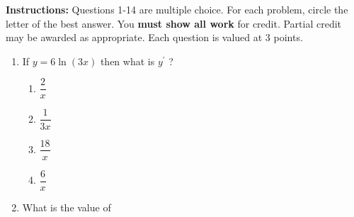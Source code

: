 \documentclass{article}
\begin{document}
\pagestyle{fancy}
\fancyhf{}
\renewcommand{\footrulewidth}{0.4pt}

\noindent
\textbf{Instructions:} Questions 1-14 are multiple choice. For each problem, circle the letter of the best answer.
You \textbf{must show all work} for credit. Partial credit may be awarded as appropriate. Each question is
valued at 3 points.
\begin{enumerate}
	\itemsep2em
	\item
	\begin{minipage}[t]{\linewidth}
		If \(y=6 \ln (3 x)\) then what is \(y^{\prime}\) ?\\[0.1em]
		\begin{enumerate}
		\itemsep1em
			\item  $\dfrac{2}{x}$
			\item  $\dfrac{1}{3x}$
			\item  $\dfrac{18}{x}$
			\item  $\dfrac{6}{x}$
		\end{enumerate}
	\end{minipage}
	\item
	\begin{minipage}[t]{\linewidth}
		What is the value of


\end{minipage}
\end{enumerate}
\end{document}
